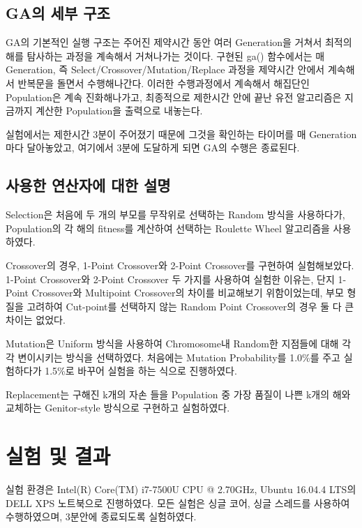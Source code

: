 \documentclass{article}
\begin{document}
\subsection{ GA의 세부 구조 }

GA의 기본적인 실행 구조는 주어진 제약시간 동안 여러 Generation을 거쳐서 최적의 해를 탐사하는 과정을 계속해서 거쳐나가는 것이다. 구현된 ga() 함수에서는 매 Generation, 즉 Select/Crossover/Mutation/Replace 과정을 제약시간 안에서 계속해서 반복문을 돌면서 수행해나간다. 이러한 수행과정에서 계속해서 해집단인 Population은 계속 진화해나가고, 최종적으로 제한시간 안에 끝난 유전 알고리즘은 지금까지 계산한 Population을 출력으로 내놓는다.

실험에서는 제한시간 3분이 주어졌기 때문에 그것을 확인하는 타이머를 매 Generation 마다 달아놓았고, 여기에서 3분에 도달하게 되면 GA의 수행은 종료된다.


\subsection{ 사용한 연산자에 대한 설명 }

Selection은 처음에 두 개의 부모를 무작위로 선택하는 Random 방식을 사용하다가, Population의 각 해의 fitness를 계산하여 선택하는 Roulette Wheel 알고리즘을 사용하였다.

Crossover의 경우, 1-Point Crossover와 2-Point Crossover를 구현하여 실험해보았다. 1-Point Crossover와 2-Point Crossover 두 가지를 사용하여 실험한 이유는, 단지 1-Point Crossover와 Multipoint Crossover의 차이를 비교해보기 위함이었는데, 부모 형질을 고려하여 Cut-point를 선택하지 않는 Random Point Crossover의 경우 둘 다 큰 차이는 없었다.

Mutation은 Uniform 방식을 사용하여 Chromosome내 Random한 지점들에 대해 각각 변이시키는 방식을 선택하였다. 처음에는 Mutation Probability를 1.0\%를 주고 실험하다가 1.5\%로 바꾸어 실험을 하는 식으로 진행하였다.

Replacement는 구해진 k개의 자손 들을 Population 중 가장 품질이 나쁜 k개의 해와 교체하는 Genitor-style 방식으로 구현하고 실험하였다.


\section{실험 및 결과}

실험 환경은 Intel(R) Core(TM) i7-7500U CPU @ 2.70GHz, Ubuntu 16.04.4 LTS의 DELL XPS 노트북으로 진행하였다. 모든 실험은 싱글 코어, 싱글 스레드를 사용하여 수행하였으며, 3분안에 종료되도록 실험하였다.
\end{document}
